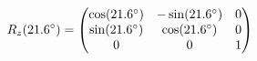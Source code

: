 \documentclass[preview]{standalone}
\begin{document}
\begin{align*}
\special{dvisvgm:raw <g id='unique000'>}R_z(21.6^\circ) = \begin{pmatrix} \cos(21.6^\circ) & -\sin(21.6^\circ) & 0 \\ \sin(21.6^\circ) & \cos(21.6^\circ) & 0 \\ 0 & 0 & 1 \end{pmatrix}\special{dvisvgm:raw </g>}
\end{align*}
\end{document}
